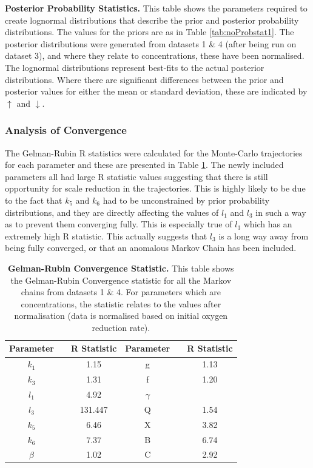 \begin{table}[tbp]
\begin{center}
\end{center}
\caption[Posterior Probability Statistics]{{\bf Posterior Probability Statistics.} This table shows the parameters required to create lognormal distributions that describe the prior and posterior probability distributions. The values for the priors are as in Table \ref{tab:noProbstat1}. The posterior distributions were generated from datasets 1 \& 4 (after being run on dataset 3), and where they relate to concentrations, these have been normalised. The lognormal distributions represent best-fits to the actual posterior distributions. Where there are significant differences between the prior and posterior values for either the mean or standard deviation, these are indicated by $\uparrow$ and $\downarrow$.
\label{tab:redone-prob-stat}}
\end{table}
\subsubsection{Analysis of Convergence}
The Gelman-Rubin R statistics were calculated for the Monte-Carlo trajectories for each parameter and these are presented in Table \ref{tab:noRstat-redone}. The newly included parameters all had large R statistic values suggesting that there is still opportunity for scale reduction in the trajectories. This is highly likely to be due to the fact that $k_5$ and $k_6$ had to be unconstrained by prior probability distributions, and they are directly affecting the values of $l_1$ and $l_3$ in such a way as to prevent them converging fully. This is especially true of $l_3$ which has an extremely high R statistic. This actually suggests that $l_3$ is a long way away from being fully converged, or that an anomalous Markov Chain has been included.

\begin{table}[tbp]%
\renewcommand{\arraystretch}{1.5}
\begin{center}
\begin{tabular}{ccc|ccc}
\toprule
\textbf{Parameter} && \textbf{R Statistic} & \textbf{Parameter} && \textbf{R Statistic}\\
\midrule
$k_1$ && 1.15 & g && 1.13\\
$k_3$ && 1.31 & f && 1.20\\
$l_1$ && 4.92 & $\gamma$ && \\
$l_3$ && 131.447 & Q && 1.54\\
$k_5$ && 6.46 & X && 3.82\\
$k_6$ && 7.37 & B && 6.74\\
$\beta$ && 1.02 & C && 2.92 \\
\bottomrule
\end{tabular}
\end{center}
\caption[Gelman-Rubin Convergence Statistic]{{\bf Gelman-Rubin Convergence Statistic.} This table shows the Gelman-Rubin Convergence statistic for all the Markov chains from datasets 1 \& 4. For parameters which are concentrations, the statistic relates to the values after normalisation (data is normalised based on initial oxygen reduction rate).
\label{tab:noRstat-redone}}
\end{table}

